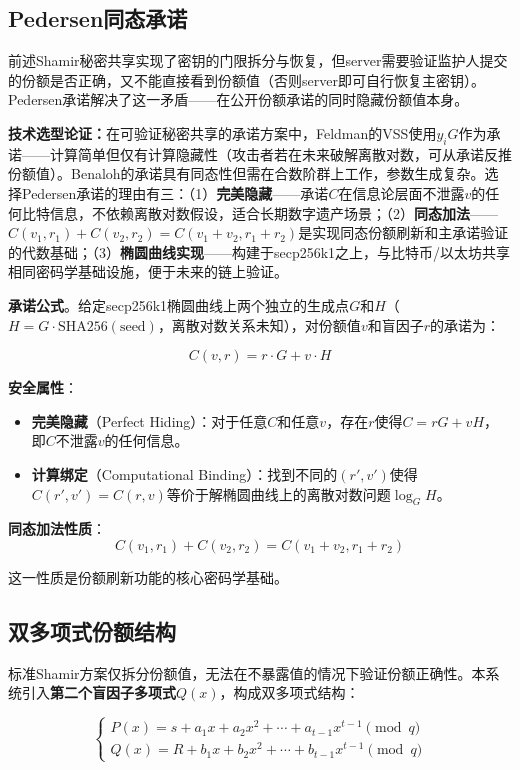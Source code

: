 \documentclass[UTF8,a4paper,zihao=-4,openany]{ctexrep}
\begin{document}
\subsection{Pedersen同态承诺}

前述Shamir秘密共享实现了密钥的门限拆分与恢复，但server需要验证监护人提交的份额是否正确，又不能直接看到份额值（否则server即可自行恢复主密钥）。Pedersen承诺解决了这一矛盾——在公开份额承诺的同时隐藏份额值本身。

\noindent \textbf{技术选型论证：}在可验证秘密共享的承诺方案中，Feldman的VSS使用$y_iG$作为承诺——计算简单但仅有计算隐藏性（攻击者若在未来破解离散对数，可从承诺反推份额值）。Benaloh的承诺具有同态性但需在合数阶群上工作，参数生成复杂。选择Pedersen承诺的理由有三：（1）\textbf{完美隐藏}——承诺$C$在信息论层面不泄露$v$的任何比特信息，不依赖离散对数假设，适合长期数字遗产场景；（2）\textbf{同态加法}——$C(v_1,r_1)+C(v_2,r_2)=C(v_1+v_2,r_1+r_2)$是实现同态份额刷新和主承诺验证的代数基础；（3）\textbf{椭圆曲线实现}——构建于secp256k1之上，与比特币/以太坊共享相同密码学基础设施，便于未来的链上验证。

\noindent \textbf{承诺公式}。给定secp256k1椭圆曲线上两个独立的生成点$G$和$H$（$H = G \cdot \text{SHA256}(\text{seed})$，离散对数关系未知），对份额值$v$和盲因子$r$的承诺为：

\[
C(v, r) = r \cdot G + v \cdot H
\]

\noindent \textbf{安全属性}：
\begin{itemize}
  \item \textbf{完美隐藏}（Perfect Hiding）：对于任意$C$和任意$v$，存在$r$使得$C = rG + vH$，即$C$不泄露$v$的任何信息。
  \item \textbf{计算绑定}（Computational Binding）：找到不同的$(r', v')$使得$C(r', v') = C(r, v)$等价于解椭圆曲线上的离散对数问题$\log_G H$。
\end{itemize}

\noindent \textbf{同态加法性质}：
\[
C(v_1, r_1) + C(v_2, r_2) = C(v_1 + v_2, r_1 + r_2)
\]

这一性质是份额刷新功能的核心密码学基础。

\subsection{双多项式份额结构}

标准Shamir方案仅拆分份额值，无法在不暴露值的情况下验证份额正确性。本系统引入\textbf{第二个盲因子多项式}$Q(x)$，构成双多项式结构：

\[
\begin{cases}
P(x) = s + a_1x + a_2x^2 + \cdots + a_{t-1}x^{t-1} \pmod{q} \\
Q(x) = R + b_1x + b_2x^2 + \cdots + b_{t-1}x^{t-1} \pmod{q}
\end{cases}
\]
\end{document}
